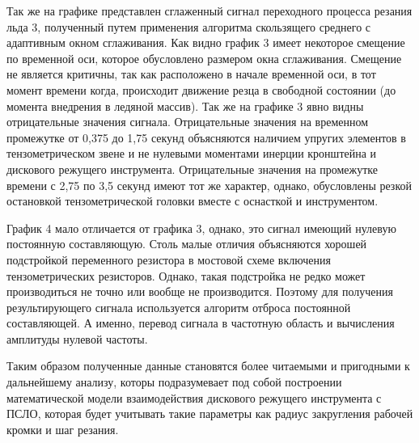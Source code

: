 Так же на графике представлен сглаженный сигнал переходного процесса резания льда 3, полученный путем применения алгоритма скользящего среднего с адаптивным окном сглаживания. Как видно график 3 имеет некоторое смещение по временной оси, которое обусловлено размером окна сглаживания. Смещение не является критичны, так как расположено в начале временной оси, в тот момент времени когда, происходит движение резца в свободной состоянии (до момента внедрения в ледяной массив). Так же на графике 3 явно видны отрицательные значения сигнала. Отрицательные значения на временном промежутке от 0,375 до 1,75 секунд объясняются наличием упругих элементов в тензометрическом звене и не нулевыми моментами инерции кронштейна и дискового режущего инструмента. Отрицательные значения на промежутке времени с 2,75 по 3,5 секунд имеют тот же характер, однако, обусловлены резкой остановкой тензометрической головки вместе с оснасткой и инструментом.

График 4 мало отличается от графика 3, однако, это сигнал имеющий нулевую постоянную составляющую. Столь малые отличия объясняются хорошей подстройкой переменного резистора в мостовой схеме включения тензометрических резисторов. Однако, такая подстройка не редко может производиться не точно или вообще не производится. Поэтому для получения результирующего сигнала используется алгоритм отброса постоянной составляющей. А именно, перевод сигнала в частотную область и вычисления амплитуды нулевой частоты.

Таким образом полученные данные становятся более читаемыми и пригодными к дальнейшему анализу, которы подразумевает под собой построении математической модели взаимодействия дискового режущего инструмента с ПСЛО, которая будет учитывать такие параметры как радиус закругления рабочей кромки и шаг резания.